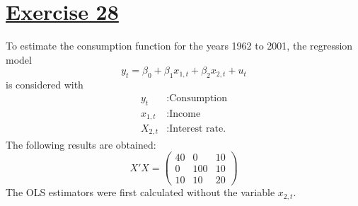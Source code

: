 \documentclass[captions=tableheading, 12pt, headings=small, parskip=half]{scrartcl}
\begin{document}
\section*{\underline{Exercise 28}}
To estimate the consumption function for the years 1962 to 2001, the regression model
\[y_t = \beta_0 + \beta_1x_{1,t} + \beta_2x_{2,t} + u_t\]
is considered with
\begin{align*}
y_t&: \text{Consumption}\\
x_{1,t} &: \text{Income}\\
X_{2,t} &: \text{Interest rate.}
\end{align*}The following results are obtained:
\[X'X = \begin{pmatrix}40&0&10\\0&100&10\\10&10&20\end{pmatrix}\]
The OLS estimators were first calculated without the variable $x_{2,t}$.
\end{document}
